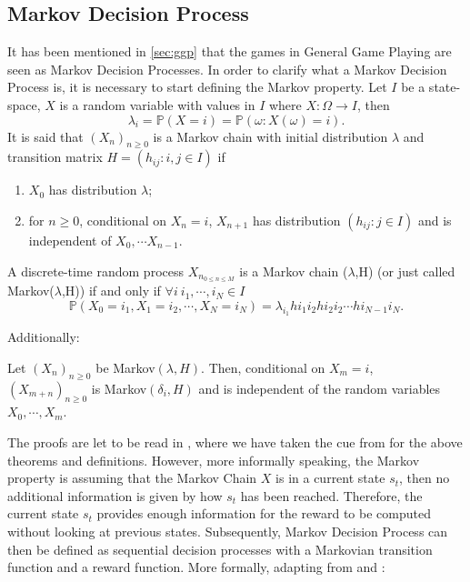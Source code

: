 \subsection{Markov Decision Process}
It has been mentioned in \ref{sec:ggp} that the games in General Game Playing are seen as Markov Decision Processes. In order to clarify what a Markov Decision Process is, it is necessary to start defining the Markov property. Let $I$ be a state-space, $X$ is a random variable with values in $I$ where $X:\Omega\rightarrow I$, then $$\lambda_i=\mathbb{P}(X=i)=\mathbb{P}({\omega : X(\omega)=i}).$$
It is said that $(X_n)_{n\geq 0}$ is a Markov chain with initial distribution $\lambda$ and transition matrix $H=(h_{ij}:i,j \in I)$ if
 \renewcommand{\labelenumi}{(\roman{enumi})}
\begin{enumerate}
\item $X_0$ has distribution $\lambda$;
\item for $n\geq 0$, conditional on $X_n=i$, $X_{n+1}$ has distribution $(h_{ij}:j\in I)$ and is independent of $X_0,\cdots X_{n-1}$.
\end{enumerate}
\begin{theorem}
A discrete-time random process $X_{n_{0\leq n \leq M}}$ is a Markov chain ($\lambda$,H) (or just called Markov($\lambda$,H)) if and only if $\forall i\ i_1,\cdots,i_N\in I$ $$\mathbb{P}(X_0=i_1, X_1=i_2,\cdots,X_N=i_N)=\lambda_{i_1}h{i_1i_2}h{i_2i_2}\cdots h{i_{N-1}i_N}.$$ 
\end{theorem}
Additionally:
\begin{theorem}
Let $(X_n)_{n\geq 0}$ be Markov$(\lambda,H)$. Then, conditional on $X_m=i$, \\$(X_{m+n})_{n\geq 0}$ is Markov$(\delta_i,H)$ and is independent of the random variables $X_0,\cdots,X_m$.
\end{theorem}
The proofs are let to be read in \cite{norris1998markov}, where we have taken the cue from for the above theorems and definitions. However, more informally speaking, the Markov property is assuming that the Markov Chain $X$ is in a current state $s_t$, then no additional information is given by how $s_t$ has been reached. Therefore, the current state $s_t$ provides enough information for the reward to be computed without looking at previous states. Subsequently, Markov Decision Process can then be defined as sequential decision processes with a Markovian transition function and a reward function\cite{russell1995modern}. More formally, adapting from \cite{puterman2014markov} and \cite{ng2000algorithms}:
